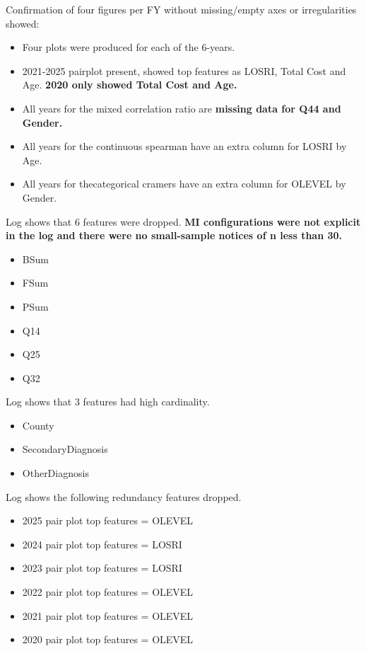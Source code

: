 \documentclass[12pt, letterpaper]{article}
\begin{document}
Confirmation of four figures per FY without missing/empty axes or irregularities showed:
\begin{itemize}
	\item Four plots were produced for each of the 6-years.
	\item 2021-2025 pairplot present, showed top features as LOSRI, Total Cost and Age. \bf{2020 only showed Total Cost and Age.}
	\item All years for the mixed correlation ratio are \bf{missing data for Q44 and Gender.}
	\item All years for the continuous spearman have an extra column for LOSRI by Age.
	\item All years for thecategorical cramers have an extra column for OLEVEL by Gender.
\end{itemize}



Log shows that 6 features were dropped. \bf{MI configurations were not explicit in the log and there were no small-sample notices of n less than 30.}
\begin{itemize}
	\item BSum
	\item FSum
	\item PSum
	\item Q14
	\item Q25
	\item Q32	
\end{itemize}

Log shows that 3 features had high cardinality. 
\begin{itemize}
	\item County
	\item SecondaryDiagnosis
	\item OtherDiagnosis	
\end{itemize}
Log shows the following redundancy features dropped.
\begin{itemize}
	\item 2025 pair plot top features = OLEVEL
	\item 2024 pair plot top features = LOSRI
	\item 2023 pair plot top features = LOSRI	
	\item 2022 pair plot top features = OLEVEL
	\item 2021 pair plot top features = OLEVEL
	\item 2020 pair plot top features = OLEVEL
\end{itemize}
\end{document}

